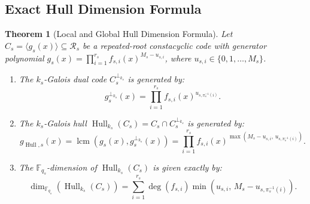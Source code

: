 \documentclass[preprint,12pt]{elsarticle}
\newcommand{\lcm}{\operatorname{lcm}}
\numberwithin{equation}{section}
\theoremstyle{plain}
\newtheorem{theorem}{Theorem}[section]
\theoremstyle{definition}
\theoremstyle{remark}
\begin{document}
\subsection{Exact Hull Dimension Formula}

\begin{theorem}[Local and Global Hull Dimension Formula]\label{thm:hull_dim_formula}
Let $C_s = \langle g_s(x)\rangle \subseteq \mathcal{R}_s$ be a repeated-root constacyclic code with generator polynomial $g_s(x) = \prod_{i=1}^{r_s} f_{s, i}(x)^{M_s - u_{s, i}}$, where $u_{s, i} \in \{0, 1, \dots, M_s\}$.
\begin{enumerate}
    \item The $k_s$-Galois dual code $C_s^{\perp_{k_s}}$ is generated by:
    \begin{equation}
        g_s^{\perp_{k_s}}(x) = \prod_{i=1}^{r_s} f_{s, i}(x)^{u_{s, \pi_s^{-1}(i)}}.
    \end{equation}
    \item The $k_s$-Galois hull $\operatorname{Hull}_{k_s}(C_s) = C_s \cap C_s^{\perp_{k_s}}$ is generated by:
    \begin{equation}
        g_{\operatorname{Hull}, s}(x) = \lcm(g_s(x), g_s^{\perp_{k_s}}(x)) = \prod_{i=1}^{r_s} f_{s, i}(x)^{\max(M_s - u_{s, i}, \, u_{s, \pi_s^{-1}(i)})}.
    \end{equation}
    \item The $\mathbb{F}_{q_s}$-dimension of $\operatorname{Hull}_{k_s}(C_s)$ is given exactly by:
    \begin{equation}\label{eq:hull_exact_formula}
        \dim_{\mathbb{F}_{q_s}}(\operatorname{Hull}_{k_s}(C_s)) = \sum_{i=1}^{r_s} \deg(f_{s, i}) \min\left(u_{s, i}, \, M_s - u_{s, \pi_s^{-1}(i)}\right).
    \end{equation}
\end{enumerate}
\end{theorem}
\end{document}
